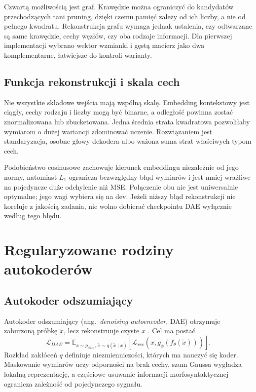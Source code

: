 Czwartą możliwością jest graf. Krawędzie można ograniczyć do kandydatów przechodzących tani pruning, dzięki czemu pamięć zależy od ich liczby, a nie od pełnego kwadratu. Rekonstrukcja grafu wymaga jednak ustalenia, czy odtwarzane są same krawędzie, cechy węzłów, czy oba rodzaje informacji. Dla pierwszej implementacji wybrano wektor wzmianki i gęstą macierz jako dwa komplementarne, łatwiejsze do kontroli warianty.

\subsection{Funkcja rekonstrukcji i skala cech}

Nie wszystkie składowe wejścia mają wspólną skalę. Embedding kontekstowy jest ciągły, cechy rodzaju i liczby mogą być binarne, a odległość powinna zostać znormalizowana lub zbucketowana. Jedna średnia strata kwadratowa pozwoliłaby wymiarom o dużej wariancji zdominować uczenie. Rozwiązaniem jest standaryzacja, osobne głowy dekodera albo ważona suma strat właściwych typom cech.

Podobieństwo cosinusowe zachowuje kierunek embeddingu niezależnie od jego normy, natomiast $L_1$ ogranicza bezwzględny błąd wymiarów i jest mniej wrażliwe na pojedyncze duże odchylenie niż MSE. Połączenie obu nie jest uniwersalnie optymalne; jego wagi wybiera się na dev. Jeżeli niższy błąd rekonstrukcji nie koreluje z jakością zadania, nie wolno dobierać checkpointu DAE wyłącznie według tego błędu.

\section{Regularyzowane rodziny autokoderów}
\label{sec:rodziny-ae}

\subsection{Autokoder odszumiający}

Autokoder odszumiający (ang.\ \emph{denoising autoencoder}, DAE) otrzymuje zaburzoną próbkę $\tilde{x}$, lecz rekonstruuje czyste $x$ \cite{vincent_2008_dae}. Cel ma postać
\[
\mathcal{L}_{DAE}=
\mathbb{E}_{x\sim p_{data},\,\tilde{x}\sim q(\tilde{x}\mid x)}
\left[\mathcal{L}_{rec}\left(x,g_\phi(f_\theta(\tilde{x}))\right)\right].
\]
Rozkład zakłóceń $q$ definiuje niezmienniczości, których ma nauczyć się koder. Maskowanie wymiarów uczy odporności na brak cechy, szum Gaussa wygładza lokalną reprezentację, a częściowe usuwanie informacji morfosyntaktycznej ogranicza zależność od pojedynczego sygnału.

